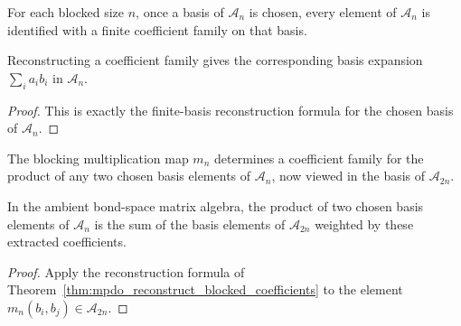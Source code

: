 \begin{definition}%
    \label{def:mpdo_blocked_coefficients}
    \leanok
    For each blocked size $n$, once a basis of $\mathcal{A}_n$ is chosen,
    every element of $\mathcal{A}_n$ is identified with a finite coefficient
    family on that basis.
\end{definition}

\begin{theorem}%
    \label{thm:mpdo_reconstruct_blocked_coefficients}
    \leanok
    Reconstructing a coefficient family gives the corresponding basis
    expansion $\sum_i a_i b_i$ in $\mathcal{A}_n$.
\end{theorem}
\begin{proof}\leanok
    This is exactly the finite-basis reconstruction formula for the chosen basis of
    $\mathcal{A}_n$.
\end{proof}

\begin{definition}%
    \label{def:mpdo_blocked_structure_coefficients}
    \leanok
    The blocking multiplication map $m_n$ determines a coefficient family for
    the product of any two chosen basis elements of $\mathcal{A}_n$, now viewed
    in the basis of $\mathcal{A}_{2n}$.
\end{definition}

\begin{theorem}%
    \label{thm:mpdo_mul_coefficients_reconstruct}
    \leanok
    In the ambient bond-space matrix algebra, the product of two chosen basis
    elements of $\mathcal{A}_n$ is the sum of the basis elements of
    $\mathcal{A}_{2n}$ weighted by these extracted coefficients.
\end{theorem}
\begin{proof}\leanok
    Apply the reconstruction formula of
    Theorem~\ref{thm:mpdo_reconstruct_blocked_coefficients} to the element
    $m_n(b_i,b_j) \in \mathcal{A}_{2n}$.
\end{proof}

